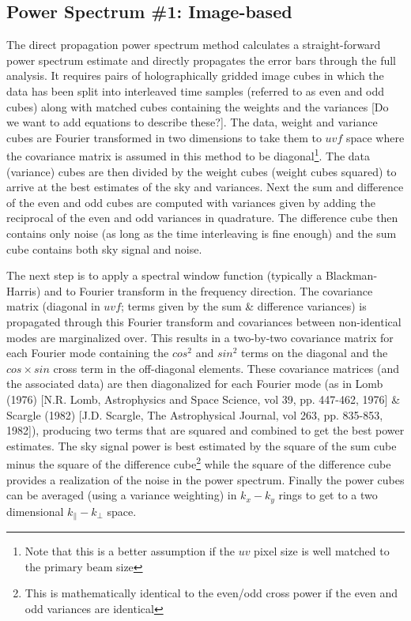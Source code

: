 \subsection{Power Spectrum \#1: Image-based}
The direct propagation power spectrum method calculates a straight-forward power spectrum estimate and directly propagates the error bars through the full analysis. It requires pairs of holographically gridded image cubes in which the data has been split into interleaved time samples (referred to as even and odd cubes) along with matched cubes containing the weights and the variances [Do we want to add equations to describe these?].  The data, weight and variance cubes are Fourier transformed in two dimensions to take them to $uvf$ space where the covariance matrix is assumed in this method to be diagonal\footnote{Note that this is a better assumption if the $uv$ pixel size is well matched to the primary beam size}. The data (variance) cubes are then divided by the weight cubes (weight cubes squared) to arrive at the best estimates of the sky and variances. Next the sum and difference of the even and odd cubes are computed with variances given by adding the reciprocal of the even and odd variances in quadrature. The difference cube then contains only noise (as long as the time interleaving is fine enough) and the sum cube contains both sky signal and noise.

The next step is to apply a spectral window function (typically a Blackman-Harris) and to Fourier transform in the frequency direction. The covariance matrix (diagonal in $uvf$; terms given by the sum & difference variances) is propagated through this Fourier transform and covariances between non-identical modes are marginalized over. This results in a two-by-two covariance matrix for each Fourier mode containing the $cos^2$ and $sin^2$ terms on the diagonal and the $cos\times sin$ cross term in the off-diagonal elements. These covariance matrices (and the associated data) are then diagonalized for each Fourier mode (as in Lomb (1976) [N.R. Lomb, Astrophysics and Space Science, vol 39, pp. 447-462, 1976] & Scargle (1982) [J.D. Scargle, The Astrophysical Journal, vol 263, pp. 835-853, 1982]), producing two terms that are squared and combined to get the best power estimates. The sky signal power is best estimated by the square of the sum cube minus the square of the difference cube\footnote{This is mathematically identical to the even/odd cross power if the even and odd variances are identical} while the square of the difference cube provides a realization of the noise in the power spectrum. Finally the power cubes can be averaged (using a variance weighting) in $k_x-k_y$ rings to get to a two dimensional $k_{\|}-k_{\bot}$ space.